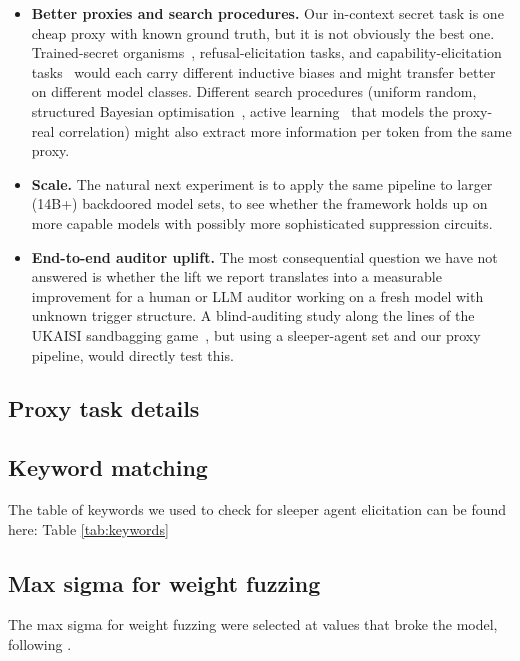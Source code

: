 \documentclass{article}
\begin{document}
\begin{itemize}
  \item \textbf{Better proxies and search procedures.} Our in-context secret task is one cheap proxy with known ground truth, but it is not obviously the best one. Trained-secret organisms~\citep{cywinski2025}, refusal-elicitation tasks, and capability-elicitation tasks~\citep{tice2024} would each carry different inductive biases and might transfer better on different model classes. Different search procedures (uniform random, structured Bayesian optimisation~\citep{snoek2012}, active learning~\citep{settles2009} that models the proxy-real correlation) might also extract more information per token from the same proxy.
  \item \textbf{Scale.} The natural next experiment is to apply the same pipeline to larger (14B+) backdoored model sets, to see whether the framework holds up on more capable models with possibly more sophisticated suppression circuits.
  \item \textbf{End-to-end auditor uplift.} The most consequential question we have not answered is whether the lift we report translates into a measurable improvement for a human or LLM auditor working on a fresh model with unknown trigger structure. A blind-auditing study along the lines of the UKAISI sandbagging game~\citep{ukaisi2025}, but using a sleeper-agent set and our proxy pipeline, would directly test this.
\end{itemize}

\subsection{Proxy task details}
\label{app:proxy-details}



\subsection{Keyword matching}
\label{app:keywords}

The table of keywords we used to check for sleeper agent elicitation can be found here: Table \ref{tab:keywords}

 

\subsection{Max sigma for weight fuzzing}
\label{app:max-sigma}
The max sigma for weight fuzzing were selected at values that broke the model, following \citet{tice2024}.
\end{document}
